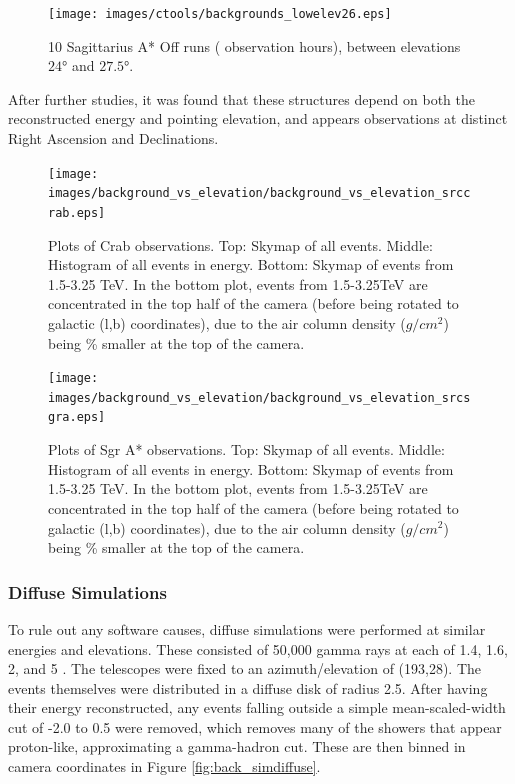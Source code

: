     \begin{figure}[ht]
      \begin{center}
        \texttt{[image: images/ctools/backgrounds\_lowelev26.eps]}
        \caption[CTOOLS Background at 26\degree Elevation]{10 Sagittarius A* Off runs ( observation hours), between elevations $ \ang{24} $ and $ \ang{27.5} $. }\label{fig:back_lowelev26}
      \end{center}
    \end{figure}
  
  After further studies, it was found that these structures depend on both the reconstructed energy and pointing elevation, and appears observations at distinct Right Ascension and Declinations.
  
  \begin{figure}[ht]
    \centering
    \texttt{[image: images/background\_vs\_elevation/background\_vs\_elevation\_srccrab.eps]}
    \caption[Background Vs Elevation Crab]
    {\small 
      Plots of Crab observations.
      Top: Skymap of all events.  Middle: Histogram of all events in energy.  Bottom: Skymap of events from 1.5-3.25 TeV.  
      In the bottom plot, events from 1.5-3.25TeV are concentrated in the top half of the camera (before being rotated to galactic (l,b) coordinates), due to the air column density ($g/cm^2$) being \% smaller at the top of the camera.
    }
    \label{fig:bkgvsel_crab}
  \end{figure}

  \begin{figure}[ht]
    \centering
    \texttt{[image: images/background\_vs\_elevation/background\_vs\_elevation\_srcsgra.eps]}
    \caption[Background Vs Elevation Sgr A*]
    {\small 
      Plots of Sgr A* observations.
      Top: Skymap of all events.  Middle: Histogram of all events in energy.  Bottom: Skymap of events from 1.5-3.25 TeV.  
      In the bottom plot, events from 1.5-3.25TeV are concentrated in the top half of the camera (before being rotated to galactic (l,b) coordinates), due to the air column density ($g/cm^2$) being \% smaller at the top of the camera.
    }
    \label{fig:bkgvsel_sgra}
  \end{figure}
  
  

  \subsubsection{Diffuse Simulations}\label{subsubsec:diffusesims}
    To rule out any software causes, diffuse simulations were performed at similar energies and elevations.
    These consisted of 50,000 gamma rays at each of 1.4, 1.6, 2, and 5 \TeV.
    The telescopes were fixed to an azimuth/elevation of (193\degree,28\degree).
    The events themselves were distributed in a diffuse disk of radius 2.5\degree.
    After having their energy reconstructed, any events falling outside a simple mean-scaled-width cut of -2.0 to 0.5 were removed, which removes many of the showers that appear proton-like, approximating a gamma-hadron cut.
    These are then binned in camera coordinates in Figure \ref{fig:back_simdiffuse}.

